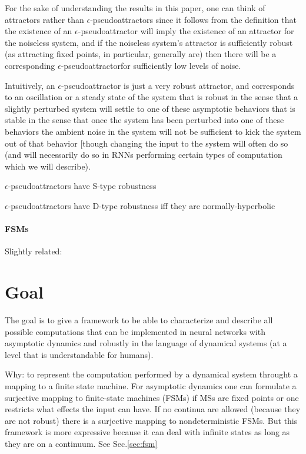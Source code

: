 \documentclass{scrartcl}
\theoremstyle{definition}
\theoremstyle{remark}
\begin{document}
For the sake of understanding the results in this paper, one can think of attractors rather than $\epsilon$-pseudoattractors since it follows from the definition that the existence of an $\epsilon$-pseudoattractor will imply the existence of an attractor for the noiseless system, and if the noiseless system's attractor is sufficiently robust (as attracting fixed points, in particular, generally are) then there will be a corresponding $\epsilon$-pseudoattractorfor sufficiently low levels of noise.

Intuitively, an $\epsilon$-pseudoattractor is just a very robust attractor, and corresponds to an oscillation or a steady state of the system that is robust in the sense that a slightly perturbed system will settle to one of these asymptotic behaviors that is stable in the sense that once the system has been perturbed into one of these behaviors the ambient noise in the system will not be sufficient to kick the system out of that behavior [though changing the input to the system will often do so (and will necessarily do so in RNNs performing certain types of computation which we will describe).

$\epsilon$-pseudoattractors have S-type robustness

$\epsilon$-pseudoattractors have D-type robustness iff they are normally-hyperbolic




\paragraph{FSMs}
\citep{casey1996}
Slightly related: 
\citep{cotteret2024vector}
\citep{oliva2019}





\section*{Goal}
The goal is to give a framework to be able to characterize and describe all possible computations that can be implemented in neural networks with asymptotic dynamics and robustly in the language of dynamical systems (at a level that is understandable for humans).

Why: to represent the computation performed by a dynamical system throught a mapping to a finite state machine.
For asymptotic dynamics one can formulate a surjective mapping to finite-state machines (FSMs) if MSs are fixed points or one restricts what effects the input can have.
If no continua are allowed (because they are not robust) there is a surjective mapping to nondeterministic FSMs. 
But this framework is more expressive because it can deal with infinite states as long as they are on a continuum.
See Sec.\ref{sec:fsm}
\end{document}
